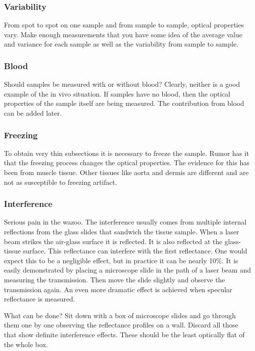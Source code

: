 \documentclass{article}
\begin{document}
\subsubsection{Variability}
From spot to spot on one sample and from sample to sample, optical properties vary.  Make enough
measurements that you have some idea of the average value and variance for
each sample as well as the variability from sample to sample.

\subsubsection{Blood} 
Should samples be measured with or without blood?
Clearly, neither is a good example of the in vivo situation.  If
samples have no blood, then the optical properties of the sample itself are
being measured.  The contribution from blood can be added later.

\subsubsection{Freezing}  
To obtain very thin subsections it is necessary to freeze the sample.  Rumor
has it that the freezing process changes the optical properties.  The
evidence for this has been from muscle tissue.  Other tissues like aorta and
dermis are different and are not as susceptible to freezing artifact.

\subsubsection{Interference}  
Serious pain in the wazoo.  The interference usually comes from multiple
internal reflections from the glass
slides that sandwich the tissue sample.  When a laser beam strikes the
air-glass surface it is reflected.  It is also reflected at the
glass-tissue surface.  This reflectance can interfere with the first
reflectance.  One would expect this to be a negligible effect, but in practice
it can be nearly 10\%.  It is easily demonstrated by placing a microscope
slide in the path of a laser beam and measuring the transmission.  Then
move the slide slightly and observe the transmission again.  An even more
dramatic effect is achieved when specular reflectance is measured.

What can be done?  Sit down with a box of microscope slides and go through
them one by one observing the reflectance profiles on a wall.  Discard all
those that show definite interference effects.  These should be the least
optically flat of the whole box.
\end{document}
